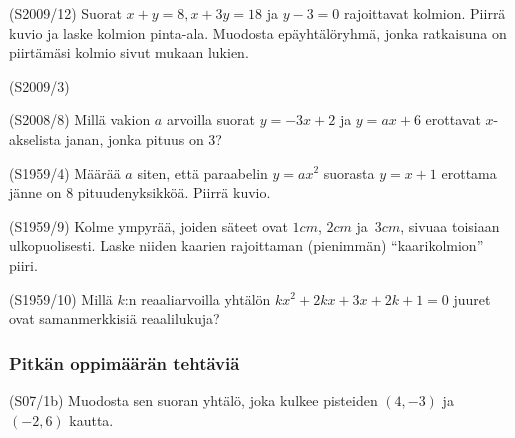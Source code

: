 \begin{tehtava}  (S2009/12)
Suorat $x+y=8, x+3y=18$ ja $y-3=0$ rajoittavat kolmion. Piirrä kuvio ja laske kolmion pinta-ala. Muodosta epäyhtälöryhmä, jonka ratkaisuna on piirtämäsi kolmio sivut mukaan lukien.
\end{tehtava}

\begin{tehtava}  (S2009/3)
\begin{alakohdat}
	\end{alakohdat}
\end{tehtava}


\begin{tehtava}  (S2008/8)
Millä vakion $a$ arvoilla suorat $y=-3x+2$ ja $y=ax+6$ erottavat $x$-akselista janan, jonka pituus on 3?
\end{tehtava}


\begin{tehtava}  (S1959/4)
Määrää $a$ siten, että paraabelin $y=ax^2$ suorasta $y=x+1$ erottama jänne on 8 pituudenyksikköä. Piirrä kuvio.
\end{tehtava}

\begin{tehtava}(S1959/9)
Kolme ympyrää, joiden säteet ovat $1cm$, $2cm$ ja $3cm$, sivuaa toisiaan ulkopuolisesti. Laske niiden kaarien rajoittaman (pienimmän) ``kaarikolmion'' piiri. 
\end{tehtava}

\begin{tehtava}(S1959/10)
Millä $k$:n reaaliarvoilla yhtälön $kx^2+2kx+3x+2k+1=0$ juuret ovat samanmerkkisiä reaalilukuja? 
\end{tehtava}

\subsubsection*{Pitkän oppimäärän tehtäviä}

\begin{tehtava}(S07/1b)
	Muodosta sen suoran yhtälö, joka kulkee pisteiden $(4, -3)$ ja $(-2,6)$ kautta. 
\end{tehtava}


